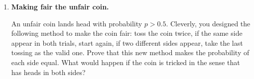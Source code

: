 \documentclass[12pt]{article}
\newif\ifsolutions
\begin{document}
\begin{enumerate}
    \ifsolutions \color{blue} \textbf{Solution:} \\
        Define the events:
        \begin{align*}
            F &= \text{the fair coin is chosen}, \quad 
            H = \text{we get heads on the flip.}
        \end{align*}
        Since we pick a coin at random:
        \[
        P(F) = P(\text{two-headed coin}) = \frac{1}{2}.
        \]
        The probabilities of flipping heads given the selected coins are
        \[
        P(H | F) = \frac{1}{2}, \quad P(H | \text{two-headed}) = 1.
        \]
        By Bayes’ Rule:
        \[
        P(F | H) = \frac{P(H | F) P(F)}{P(H)}.
        \]
        Note that we need $P(H)$, which we compute as follows using the Law of Total Probability:
        \begin{align*}
            P(H) &= P(H | F) P(F) + P(H | \text{two-headed}) P(\text{two-headed}) \\
            &= \left(\frac{1}{2} \times \frac{1}{2}\right) + \left(1 \times \frac{1}{2}\right) = \frac{1}{4} + \frac{1}{2} = \frac{3}{4}
        \end{align*}
        Going back to Bayes’ formula:
        \[
        P(F | H) = \frac{\frac{1}{2} \times \frac{1}{2}}{\frac{3}{4}} = \frac{\frac{1}{4}}{\frac{3}{4}} = \frac{1}{3}.
        \]
    \fi \color{black}

    \item \textbf{Making fair the unfair coin.}    

    An unfair coin lands head with probability $p > 0.5$. Cleverly, you designed the following method to make the coin fair: toss the coin twice, if the same side appear in both trials, start again, if two different sides appear, take the last tossing as the valid one. Prove that this new method makes the probability of each side equal. What would happen if the coin is tricked in the sense that has heads in both sides? 


\end{enumerate}
\end{document}

